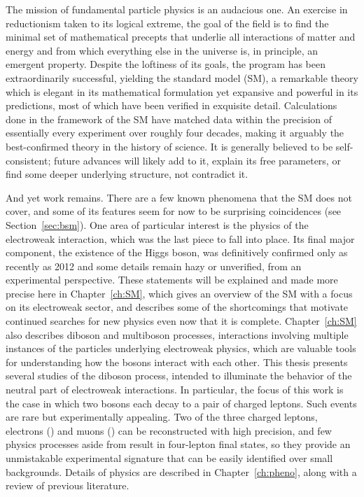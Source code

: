The mission of fundamental particle physics is an audacious one.
An exercise in reductionism taken to its logical extreme, the goal of the field is to find the minimal set of mathematical precepts that underlie all interactions of matter and energy and from which everything else in the universe is, in principle, an emergent property.
Despite the loftiness of its goals, the program has been extraordinarily successful, yielding the standard model (SM), a remarkable theory which is elegant in its mathematical formulation yet expansive and powerful in its predictions, most of which have been verified in exquisite detail.
Calculations done in the framework of the SM have matched data within the precision of essentially every experiment over roughly four decades, making it arguably the best-confirmed theory in the history of science.
It is generally believed to be self-consistent; future advances will likely add to it, explain its free parameters, or find some deeper underlying structure, not contradict it.

And yet work remains.
There are a few known phenomena that the SM does not cover, and some of its features seem for now to be surprising coincidences (see Section~\ref{sec:bsm}).
One area of particular interest is the physics of the electroweak interaction, which was the last piece to fall into place.
Its final major component, the existence of the Higgs boson, was definitively confirmed only as recently as 2012 and some details remain hazy or unverified, from an experimental perspective.
These statements will be explained and made more precise here in Chapter~\ref{ch:SM}, which gives an overview of the SM with a focus on its electroweak sector, and describes some of the shortcomings that motivate continued searches for new physics even now that it is complete.
Chapter~\ref{ch:SM} also describes diboson and multiboson processes, interactions involving multiple instances of the particles underlying electroweak physics, which are valuable tools for understanding how the bosons interact with each other.
This thesis presents several studies of the {\ZZ} diboson process, intended to illuminate the behavior of the neutral part of electroweak interactions.
In particular, the focus of this work is the case in which two {\PZ} bosons each decay to a pair of charged leptons.
Such events are rare but experimentally appealing.
Two of the three charged leptons, electrons ({\Pe}) and muons ({\Pm}) can be reconstructed with high precision, and few physics processes aside from {\ZZ} result in four-lepton final states, so they provide an unmistakable experimental signature that can be easily identified over small backgrounds.
Details of {\ZZ} physics are described in Chapter~\ref{ch:pheno}, along with a review of previous literature.

